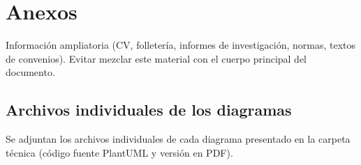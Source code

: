 \section*{Anexos}
Información ampliatoria (CV, folletería, informes de investigación, normas, textos de convenios).
Evitar mezclar este material con el cuerpo principal del documento.

\subsection*{Archivos individuales de los diagramas}
Se adjuntan los archivos individuales de cada diagrama presentado en la carpeta técnica (código fuente PlantUML y versión en PDF).
